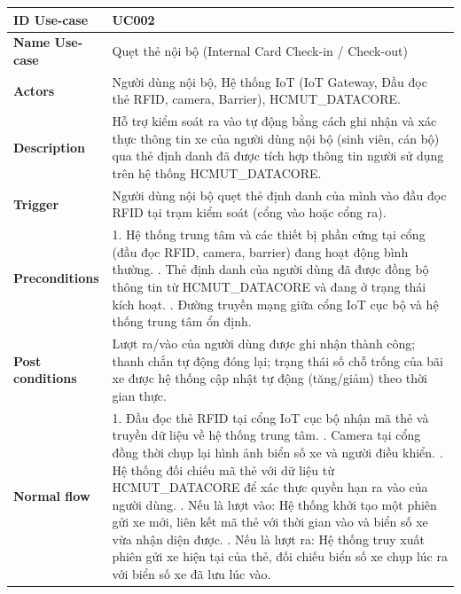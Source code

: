\begin{center}
    \begin{longtable}{|>{\raggedright\arraybackslash}m{3.5cm}|m{12cm}|}
\hline
    \textbf{ID Use-case}  & UC002 \\ 
\hline
    \textbf{Name Use-case} & Quẹt thẻ nội bộ (Internal Card Check-in / Check-out) \\ 
\hline
    \textbf{Actors} & Người dùng nội bộ, Hệ thống IoT (IoT Gateway, Đầu đọc thẻ RFID, camera, Barrier), HCMUT\_DATACORE. \\
\hline
    \textbf{Description} & Hỗ trợ kiểm soát ra vào tự động bằng cách ghi nhận và xác thực thông tin xe của người dùng nội bộ (sinh viên, cán bộ) qua thẻ định danh đã được tích hợp thông tin người sử dụng trên hệ thống HCMUT\_DATACORE. \\
\hline
    \textbf{Trigger} & Người dùng nội bộ quẹt thẻ định danh của mình vào đầu đọc RFID tại trạm kiểm soát (cổng vào hoặc cổng ra). \\
\hline
    \textbf{Preconditions} & 
    1. Hệ thống trung tâm và các thiết bị phần cứng tại cổng (đầu đọc RFID, camera, barrier) đang hoạt động bình thường. \newline
    2. Thẻ định danh của người dùng đã được đồng bộ thông tin từ HCMUT\_DATACORE và đang ở trạng thái kích hoạt. \newline
    3. Đường truyền mạng giữa cổng IoT cục bộ và hệ thống trung tâm ổn định. \\
\hline
    \textbf{Post conditions} & Lượt ra/vào của người dùng được ghi nhận thành công; thanh chắn tự động đóng lại; trạng thái số chỗ trống của bãi xe được hệ thống cập nhật tự động (tăng/giảm) theo thời gian thực. \\
\hline
    \textbf{Normal flow} & 
    1. Đầu đọc thẻ RFID tại cổng IoT cục bộ nhận mã thẻ và truyền dữ liệu về hệ thống trung tâm. \newline
    2. Camera tại cổng đồng thời chụp lại hình ảnh biển số xe và người điều khiển. \newline
    3. Hệ thống đối chiếu mã thẻ với dữ liệu từ HCMUT\_DATACORE để xác thực quyền hạn ra vào của người dùng. \newline
    4. Nếu là lượt vào: Hệ thống khởi tạo một phiên gửi xe mới, liên kết mã thẻ với thời gian vào và biển số xe vừa nhận diện được. \newline
    5. Nếu là lượt ra: Hệ thống truy xuất phiên gửi xe hiện tại của thẻ, đối chiếu biển số xe chụp lúc ra với biển số xe đã lưu lúc vào. \newline

\end{longtable}
\end{center}
